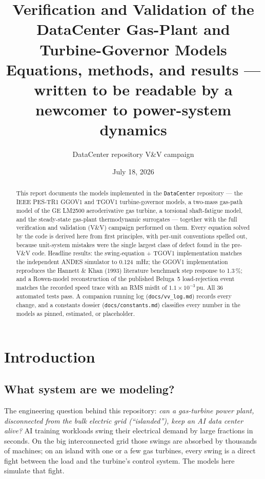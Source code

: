 \documentclass[11pt]{article}
\title{Verification and Validation of the DataCenter Gas-Plant and
  Turbine-Governor Models\\
  \large Equations, methods, and results --- written to be readable by a
  newcomer to power-system dynamics}
\author{DataCenter repository V\&V campaign}
\date{July 18, 2026}
\newcommand{\pu}{\,\text{pu}}
\begin{document}
\maketitle

\begin{abstract}
This report documents the models implemented in the \texttt{DataCenter}
repository --- the IEEE PES-TR1 \textsc{GGOV1} and \textsc{TGOV1}
turbine-governor models, a two-mass gas-path model of the GE LM2500
aeroderivative gas turbine, a torsional shaft-fatigue model, and the
steady-state gas-plant thermodynamic surrogates --- together with the full
verification and validation (V\&V) campaign performed on them. Every
equation solved by the code is derived here from first principles, with
per-unit conventions spelled out, because unit-system mistakes were the
single largest class of defect found in the pre-V\&V code. Headline
results: the swing-equation + TGOV1 implementation matches the independent
ANDES simulator to \SI{0.124}{mHz}; the GGOV1 implementation reproduces the
Hannett \& Khan (1993) literature benchmark step response to 1.3\,\%; and a
Rowen-model reconstruction of the published Beluga~5 load-rejection event
matches the recorded speed trace with an RMS misfit of
$1.1\times10^{-3}\pu$. All 36 automated tests pass. A companion running log
(\texttt{docs/vv\_log.md}) records every change, and a constants dossier
(\texttt{docs/constants.md}) classifies every number in the models as
pinned, estimated, or placeholder.
\end{abstract}

\tableofcontents
\clearpage

\section{Introduction}

\subsection{What system are we modeling?}

The engineering question behind this repository: \emph{can a gas-turbine
power plant, disconnected from the bulk electric grid (``islanded''), keep
an AI data center alive?} AI training workloads swing their electrical
demand by large fractions in seconds. On the big interconnected grid those
swings are absorbed by thousands of machines; on an island with one or a
few gas turbines, every swing is a direct fight between the load and the
turbine's control system. The models here simulate that fight.
\end{document}
